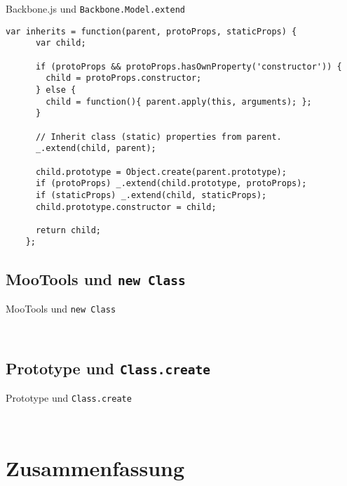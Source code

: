 \begin{frame}[fragile]{Backbone.js und \texttt{Backbone.Model.extend}}
  \begin{lstlisting}[gobble=4]
    var inherits = function(parent, protoProps, staticProps) {
      var child;
    
      if (protoProps && protoProps.hasOwnProperty('constructor')) {
        child = protoProps.constructor;
      } else {
        child = function(){ parent.apply(this, arguments); };
      }
    
      // Inherit class (static) properties from parent.
      _.extend(child, parent);
    
      child.prototype = Object.create(parent.prototype);
      if (protoProps) _.extend(child.prototype, protoProps);
      if (staticProps) _.extend(child, staticProps);
      child.prototype.constructor = child;
    
      return child;
    };
  \end{lstlisting}
\end{frame}

\subsection{MooTools und \texttt{new Class}}

\begin{frame}[fragile]{MooTools und \texttt{new Class}}
  \begin{lstlisting}[gobble=4]
  
  \end{lstlisting}
\end{frame}

\subsection{Prototype und \texttt{Class.create}}

\begin{frame}[fragile]{Prototype und \texttt{Class.create}}
  \begin{lstlisting}[gobble=4]
  
  \end{lstlisting}
\end{frame}

\section*{Zusammenfassung}

